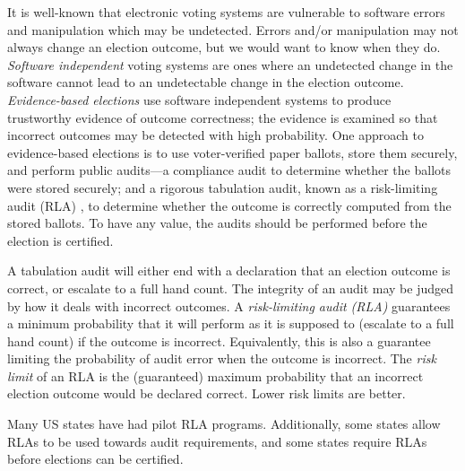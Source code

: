 It is well-known that electronic voting systems are vulnerable to software errors and manipulation which may be undetected. Errors and/or manipulation may not always change an election outcome, but we would want to know when they do. {\em Software independent} voting systems \cite{SI-Wack,rivest2008notion} are ones where an undetected change in the software cannot lead to an undetectable change in the election outcome. {\em Evidence-based elections} \cite{evidence-based} use software independent systems to produce trustworthy evidence of outcome correctness; the evidence is examined so that incorrect outcomes may be detected with high probability. One approach to evidence-based elections is to use voter-verified paper ballots, store them securely, and perform public audits---a compliance audit to determine whether the ballots were stored securely; and a rigorous tabulation audit, known as a risk-limiting audit (RLA) \cite{RLA}, to determine whether the outcome is correctly computed from the stored ballots. To have any value, the audits should be performed before the election is certified. 

A tabulation audit will either end with a declaration that an election outcome is correct, or escalate to a full hand count. The integrity of an audit may be judged by how it deals with incorrect outcomes. A {\em risk-limiting audit (RLA)} guarantees a minimum probability that it will perform as it is supposed to (escalate to a full hand count) if the outcome is incorrect. Equivalently, this is also a guarantee limiting the probability of audit error when the outcome is incorrect. The {\em risk limit} of an RLA is the (guaranteed) maximum probability that an incorrect election outcome would be declared correct. Lower risk limits are better. 

Many US states have had pilot RLA programs. Additionally, some states allow RLAs to be used towards audit requirements, and some states require RLAs before elections can be certified. 


